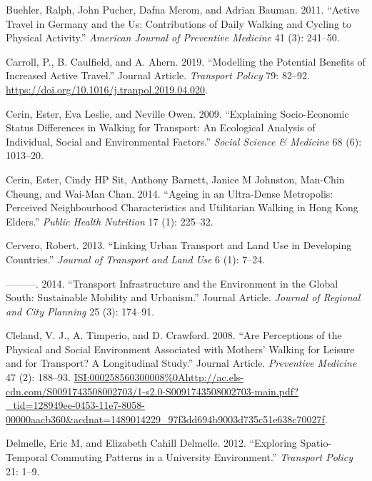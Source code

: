 \documentclass[]{elsarticle} %
\begin{document}
\leavevmode\hypertarget{ref-buehler2011active}{}%
Buehler, Ralph, John Pucher, Dafna Merom, and Adrian Bauman. 2011.
``Active Travel in Germany and the Us: Contributions of Daily Walking
and Cycling to Physical Activity.'' \emph{American Journal of Preventive
Medicine} 41 (3): 241--50.

\leavevmode\hypertarget{ref-Carroll2019modelling}{}%
Carroll, P., B. Caulfield, and A. Ahern. 2019. ``Modelling the Potential
Benefits of Increased Active Travel.'' Journal Article. \emph{Transport
Policy} 79: 82--92. \url{https://doi.org/10.1016/j.tranpol.2019.04.020}.

\leavevmode\hypertarget{ref-cerin2009explaining}{}%
Cerin, Ester, Eva Leslie, and Neville Owen. 2009. ``Explaining
Socio-Economic Status Differences in Walking for Transport: An
Ecological Analysis of Individual, Social and Environmental Factors.''
\emph{Social Science \& Medicine} 68 (6): 1013--20.

\leavevmode\hypertarget{ref-cerin2014ageing}{}%
Cerin, Ester, Cindy HP Sit, Anthony Barnett, Janice M Johnston, Man-Chin
Cheung, and Wai-Man Chan. 2014. ``Ageing in an Ultra-Dense Metropolis:
Perceived Neighbourhood Characteristics and Utilitarian Walking in Hong
Kong Elders.'' \emph{Public Health Nutrition} 17 (1): 225--32.

\leavevmode\hypertarget{ref-cervero2013linking}{}%
Cervero, Robert. 2013. ``Linking Urban Transport and Land Use in
Developing Countries.'' \emph{Journal of Transport and Land Use} 6 (1):
7--24.

\leavevmode\hypertarget{ref-Cervero2014transport}{}%
---------. 2014. ``Transport Infrastructure and the Environment in the
Global South: Sustainable Mobility and Urbanism.'' Journal Article.
\emph{Journal of Regional and City Planning} 25 (3): 174--91.

\leavevmode\hypertarget{ref-Cleland2008perceptions}{}%
Cleland, V. J., A. Timperio, and D. Crawford. 2008. ``Are Perceptions of
the Physical and Social Environment Associated with Mothers' Walking for
Leisure and for Transport? A Longitudinal Study.'' Journal Article.
\emph{Preventive Medicine} 47 (2): 188--93.
\url{ISI:000258560300008\%0Ahttp://ac.els-cdn.com/S0091743508002703/1-s2.0-S0091743508002703-main.pdf?_tid=128949ee-0453-11e7-8058-00000aacb360\&acdnat=1489014229_97f3dd694b9003d735c51e638c70027f}.

\leavevmode\hypertarget{ref-delmelle2012exploring}{}%
Delmelle, Eric M, and Elizabeth Cahill Delmelle. 2012. ``Exploring
Spatio-Temporal Commuting Patterns in a University Environment.''
\emph{Transport Policy} 21: 1--9.
\end{document}
